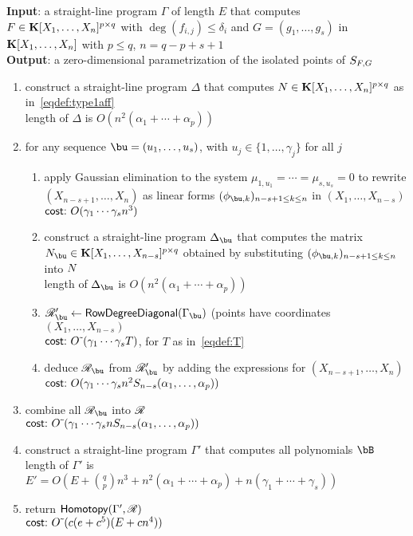 \documentclass[12pt]{article}
\begin{document}
\begin{algorithm}[!h]
\caption{$\mathsf{RowDegree}(\Gamma)$}
{\bf Input}:  a straight-line program $\Gamma$ of length $E$ that computes
 $F \in \mathbf{K}[X_1, \ldots, X_n]^{p \times q}$ with $\deg(f_{i,j}) \leq \delta_i$
and $G = (g_1, \ldots, g_s)$ in $\mathbf{K}[X_1, \ldots, X_n]$ with $p \leq q$, $n = q-p+s+1$\\
{\bf Output}: a zero-dimensional parametrization of the isolated points of $S_{{F},G}$
\begin{enumerate}
\item construct a straight-line program $\Delta$ that computes ${N} \in \mathbf{K}[X_1,\dots,X_n]^{p \times q}$ as in~\eqref{eqdef:type1aff}\\
length of $\Delta$ is $O(n^2(\alpha_1+\cdots+\alpha_p))$
\item for any sequence $\bu=(u_1,\dots,u_s)$, with $u_j \in \{1,\dots,\gamma_j\}$ for all $j$
\begin{enumerate}
\item apply Gaussian elimination to the system $\mu_{1,u_1}=\cdots=\mu_{s,u_s}=0$
  to rewrite $(X_{n-s+1}, \ldots, X_n)$ as linear forms $(\phi_{\bu,k})_{n-s+1 \le k \le n}$ in $(X_1,\dots,X_{n-s})$\\
  $\text{\sf{cost:~}} O(\gamma_1 \cdots \gamma_s n^3)$

\item construct a straight-line program $\Delta_{\bu}$ that computes the matrix 
  $\mN_\bu  \in \KK[X_1, \dots, X_{n-s}]^{p \times q}$ obtained
  by substituting $(\phi_{\bu,k})_{n-s+1 \le k \le n}$ into ${N}$ \\
  length of $\Delta_{\bu}$ is $O(n^2(\alpha_1+\cdots+\alpha_p))$

\item $\scrR'_\bu \gets \mathsf{RowDegreeDiagonal}(\Gamma_\bu)$ (points have coordinates $(X_1,\dots,X_{n-s})$\\
  $\text{\sf{cost:~}} {O}{\,\tilde{ }\,}(\gamma_1 \cdots \gamma_s T)$, for $T$ as in~\eqref{eqdef:T}

\item deduce $\scrR_\bu$ from $\scrR'_\bu$ by adding the expressions for $(X_{n-s+1},\dots,X_n)$ 
  $\text{\sf{cost:~}} O(\gamma_1 \cdots \gamma_s n^2 S_{n-s}(\alpha_1,\dots,\alpha_p))$


\end{enumerate}
\item combine all $\scrR_\bu$ into $\mathscr{R}$\\
  $\text{\sf{cost:~}} {O}{\,\tilde{ }\,}(\gamma_1 \cdots \gamma_s n S_{n-s}(\alpha_1,\dots,\alpha_p))$

\item construct a straight-line program $\Gamma'$ that computes all polynomials $\bB$\\
  length of $\Gamma'$ is $E'=O(E + {q \choose p} n^3 + n^2
(\alpha_1+\cdots+\alpha_p) + n(\gamma_1 + \cdots + \gamma_s))$

\item return $\mathsf{Homotopy}(\Gamma',\mathscr{R})$\\
 $\text{\sf{cost:~}} {O}{\,\tilde{ }\,}( c(e+c^5 )(E + cn^4) )$
\end{enumerate}
\label{Row}
\end{algorithm}


 
\end{document}
